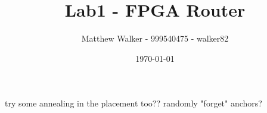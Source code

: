 \documentclass[11pt]{article}
\title{Lab1 - FPGA Router}
\author{Matthew Walker - 999540475 - walker82}
\date{\today}
\begin{document}
\maketitle

try some annealing in the placement too??
randomly "forget" anchors?
\end{document}
